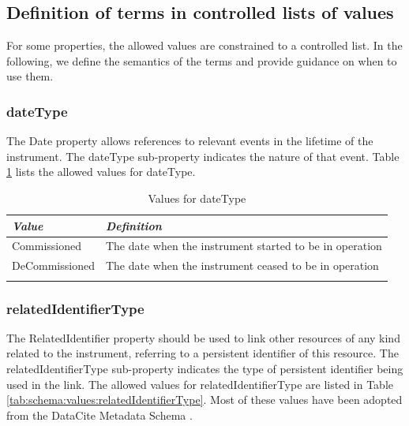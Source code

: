\documentclass[titlepage=true,twoside=false,DIV=13]{scrartcl}
\begin{document}
\subsection{Definition of terms in controlled lists of values}

For some properties, the allowed values are constrained to a
controlled list.  In the following, we define the semantics of the
terms and provide guidance on when to use them.

\newlength{\valnamecolw}\settowidth{\valnamecolw}{IsPreviousVersionOf}
\newlength{\valdefcolw}
\setlength{\valdefcolw}{\textwidth}
\addtolength{\valdefcolw}{-\valnamecolw}
\addtolength{\valdefcolw}{-4\tabcolsep}

\subsubsection{dateType}

The Date property allows references to relevant events in the lifetime
of the instrument.  The dateType sub-property indicates the nature of
that event.  Table \ref{tab:schema:values:dateType} lists the allowed
values for dateType.

\begin{longtable}{|l|l|}
  \hline
  \emph{Value} & \emph{Definition} \\
  \hline \endhead
  \hline \endfoot\endlastfoot
  Commissioned   & The date when the instrument started to be in operation \\
  DeCommissioned & The date when the instrument ceased to be in operation \\
  \hline
  \caption{Values for dateType}
  \label{tab:schema:values:dateType}
\end{longtable}

\subsubsection{relatedIdentifierType}

The RelatedIdentifier property should be used to link other resources
of any kind related to the instrument, referring to a persistent
identifier of this resource.  The relatedIdentifierType sub-property
indicates the type of persistent identifier being used in the link.
The allowed values for relatedIdentifierType are listed in Table
\ref{tab:schema:values:relatedIdentifierType}.  Most of these values
have been adopted from the DataCite Metadata Schema
\cite{datacite:schema}.
\end{document}
